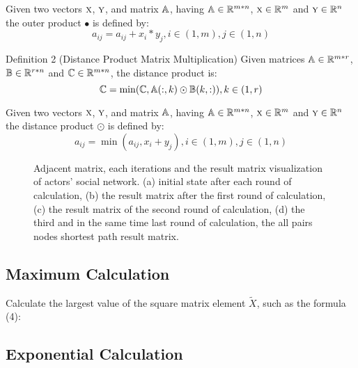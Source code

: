 \documentclass[review]{cvpr}
\begin{document}
Given two vectors \(\textsc x\), \(\textsc y\), and matrix \(\Bbb A\), having \(\Bbb A \in \Bbb R^{m*n}\), \(\textsc x \in \Bbb R^{m}\) and \(\textsc y \in \Bbb R^{n}\) the outer product \(\bullet\) is defined by:
\begin{equation}
a_{ij} = a_{ij} + x_i * y_j, i \in (1,m), j \in (1,n)
\end{equation}

Definition 2 (Distance Product Matrix Multiplication) Given matrices \(\Bbb A \in \Bbb R^{m*r}\), \(\Bbb B \in \Bbb R^{r*n}\) and \(\Bbb C \in \Bbb R^{m*n}\), the distance product is:
\begin{equation}
  \Bbb C = \min(\Bbb C, \Bbb A(:,k)\odot \Bbb B(k,:)) , k \in (1,r)
\end{equation}

Given two vectors \(\textsc x\), \(\textsc y\), and matrix \(\Bbb A\), having \(\Bbb A \in \Bbb R^{m*n}\), \(\textsc x \in \Bbb R^{m}\) and \(\textsc y \in \Bbb R^{n}\) the distance product \(\odot\) is defined by:
\begin{equation}
a_{ij} = \min(a_{ij} , x_i + y_j), i \in (1,m), j \in (1,n)
\end{equation}
\begin{figure*}
\begin{center}
\end{center}
   \caption{Adjacent matrix, each iterations and the result matrix visualization of actors' social network. (a) initial state after each round of calculation, (b) the result matrix after the first round of calculation, (c) the result matrix of the second round of calculation, (d) the third and in the same time last round of calculation, the all pairs nodes shortest path result matrix.}
\label{fig:short}
\end{figure*}


\subsection{Maximum Calculation}

Calculate the largest value of the square matrix element $\widetilde X$, such as the formula (4):

\subsection{Exponential Calculation}
\end{document}
